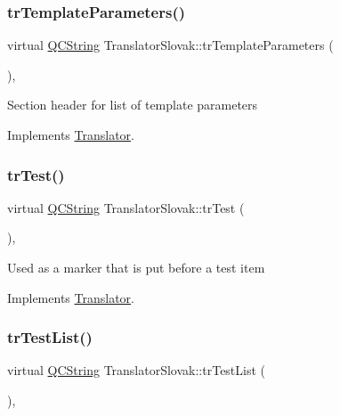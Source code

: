 \subsubsection{\texorpdfstring{trTemplateParameters()}{trTemplateParameters()}}
{\footnotesize\ttfamily virtual \mbox{\hyperlink{class_q_c_string}{Q\+C\+String}} Translator\+Slovak\+::tr\+Template\+Parameters (\begin{DoxyParamCaption}{ }\end{DoxyParamCaption})\hspace{0.3cm}{\ttfamily [inline]}, {\ttfamily [virtual]}}

Section header for list of template parameters 

Implements \mbox{\hyperlink{class_translator}{Translator}}.

\mbox{\label{class_translator_slovak_ab8d0a45b0bc6520a3ba8fe0ea6c28acd}} 
\subsubsection{\texorpdfstring{trTest()}{trTest()}}
{\footnotesize\ttfamily virtual \mbox{\hyperlink{class_q_c_string}{Q\+C\+String}} Translator\+Slovak\+::tr\+Test (\begin{DoxyParamCaption}{ }\end{DoxyParamCaption})\hspace{0.3cm}{\ttfamily [inline]}, {\ttfamily [virtual]}}

Used as a marker that is put before a test item 

Implements \mbox{\hyperlink{class_translator}{Translator}}.

\mbox{\label{class_translator_slovak_a6b50963e37d65fabf6992747256a1035}} 
\subsubsection{\texorpdfstring{trTestList()}{trTestList()}}
{\footnotesize\ttfamily virtual \mbox{\hyperlink{class_q_c_string}{Q\+C\+String}} Translator\+Slovak\+::tr\+Test\+List (\begin{DoxyParamCaption}{ }\end{DoxyParamCaption})\hspace{0.3cm}{\ttfamily [inline]}, {\ttfamily [virtual]}}


